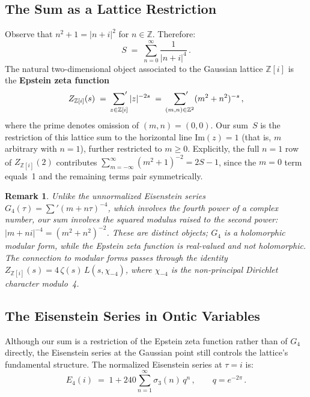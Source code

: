 \documentclass[12pt]{article}
\newtheorem{remark}[theorem]{Remark}
\newcommand{\Z}{\mathbb{Z}}
\begin{document}
\subsection{The Sum as a Lattice Restriction}

Observe that $n^2+1=|n+i|^2$ for $n\in\Z$.  Therefore:
\begin{equation}\label{eq:S-lattice}
S\;=\;\sum_{n=0}^{\infty}\frac{1}{|n+i|^4}\,.
\end{equation}
The natural two-dimensional object associated to the Gaussian lattice
$\Z[i]$ is the \textbf{Epstein zeta function}
\begin{equation}\label{eq:epstein}
Z_{\Z[i]}(s)\;=\;\sideset{}{'}\sum_{z\in\Z[i]}|z|^{-2s}
\;=\;\sideset{}{'}\sum_{(m,n)\in\Z^2}(m^2+n^2)^{-s}\,,
\end{equation}
where the prime denotes omission of $(m,n)=(0,0)$.  Our sum~$S$ is the
restriction of this lattice sum to the horizontal line $\mathrm{Im}(z)=1$
(that is, $m$ arbitrary with $n=1$), further restricted to $m\ge 0$.
Explicitly, the full $n=1$ row of $Z_{\Z[i]}(2)$ contributes
$\sum_{m=-\infty}^{\infty}(m^2+1)^{-2}=2S-1$, since the $m=0$ term equals~1
and the remaining terms pair symmetrically.

\begin{remark}\label{rem:epstein-vs-eisenstein}
Unlike the unnormalized Eisenstein series
$G_4(\tau)=\sum'(m+n\tau)^{-4}$, which involves the \emph{fourth power}
of a complex number, our sum involves the \emph{squared modulus} raised to
the second power: $|m+ni|^{-4}=(m^2+n^2)^{-2}$.  These are distinct
objects; $G_4$ is a holomorphic modular form, while the Epstein zeta
function is real-valued and not holomorphic.  The connection to modular
forms passes through the identity
$Z_{\Z[i]}(s)=4\,\zeta(s)\,L(s,\chi_{-4})$, where $\chi_{-4}$ is the
non-principal Dirichlet character modulo~4.
\end{remark}

\subsection{The Eisenstein Series in Ontic Variables}

Although our sum is a restriction of the Epstein zeta function rather than
of $G_4$ directly, the Eisenstein series at the Gaussian point still
controls the lattice's fundamental structure.  The normalized Eisenstein
series at $\tau=i$ is:
\[
E_4(i) \;=\; 1+240\sum_{n=1}^{\infty}\sigma_3(n)\,q^n\,,
\qquad q=e^{-2\pi}\,.
\]
\end{document}
